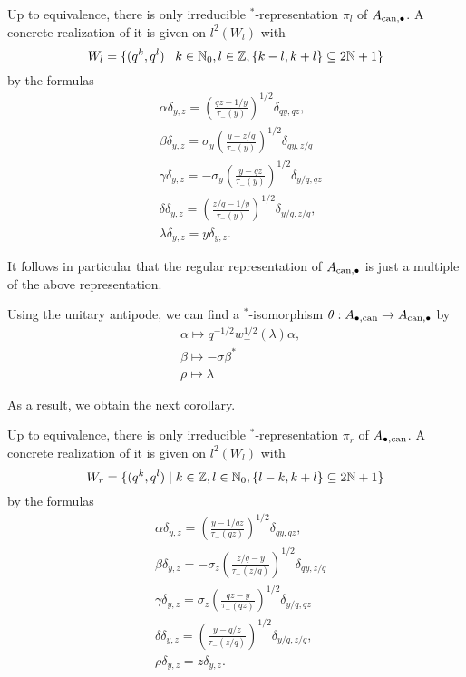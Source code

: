 \begin{Lem} Up to equivalence, there is only irreducible $^*$-representation $\pi_l$ of $A_{\operatorname{\mathrm{can}},\bullet}$. A concrete realization of it is given on $l^2(W_{l})$ with \[W_l= \{(q^k,q^l)\mid k\in \mathbb{N}_0,l\in \mathbb{Z}, \{k-l,k+l\}\subseteq 2\mathbb{N}+1\}\] by the formulas \begin{align*} &\alpha \delta_{y,z}  = \left(\frac{qz-1/y}{\tau_-(y)}\right)^{1/2} \delta_{qy,qz},\\ & \beta \delta_{y,z}= \sigma_y \left(\frac{y-z/q}{\tau_-(y)}\right)^{1/2} \delta_{qy,z/q}\\ &\gamma \delta_{y,z} = -\sigma_y \left(\frac{y-qz}{\tau_-(y)}\right)^{1/2}\delta_{y/q,qz} \\ &\delta \delta_{y,z} = \left(\frac{z/q-1/y}{\tau_-(y)}\right)^{1/2} \delta_{y/q,z/q},\\ 
& \lambda \delta_{y,z} =y\delta_{y,z}.\end{align*}
\end{Lem}

It follows in particular that the regular representation of $A_{\operatorname{\mathrm{can}},\bullet}$ is just a multiple of the above representation.

Using the unitary antipode, we can find a $^*$-isomorphism $\theta:A_{\bullet,\operatorname{\mathrm{can}}}\rightarrow A_{\operatorname{\mathrm{can}},\bullet}$ by \begin{align*} &\alpha \mapsto q^{-1/2}w_-^{1/2}(\lambda)\alpha,\\ &\beta \mapsto -\sigma \beta^*\\ &\rho\mapsto \lambda\end{align*} 

As a result, we obtain the next corollary. 

\begin{Cor} Up to equivalence, there is only irreducible $^*$-representation $\pi_r$ of $A_{\bullet,\operatorname{\mathrm{can}}}$. A concrete realization of it is given on $l^2(W_{l})$ with \[W_r= \{(q^k,q^l)\mid k\in \mathbb{Z},l\in \mathbb{N}_0, \{l-k,k+l\}\subseteq 2\mathbb{N}+1\}\] by the formulas \begin{align*} &\alpha \delta_{y,z}  = \left(\frac{y-1/qz}{\tau_-(qz)}\right)^{1/2} \delta_{qy,qz},\\ & \beta \delta_{y,z}= -\sigma_z \left(\frac{z/q-y}{\tau_-(z/q)}\right)^{1/2} \delta_{qy,z/q}\\ &\gamma \delta_{y,z} = \sigma_z \left(\frac{qz-y}{\tau_-(qz)}\right)^{1/2}\delta_{y/q,qz} \\ &\delta \delta_{y,z} = \left(\frac{y-q/z}{\tau_-(z/q)}\right)^{1/2} \delta_{y/q,z/q},\\ 
& \rho \delta_{y,z} =z\delta_{y,z}.\end{align*}
\end{Cor}

